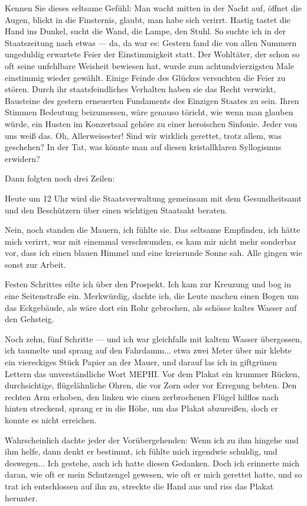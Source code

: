 Kennen Sie dieses seltsame Gefühl: Man wacht mitten in der Nacht
auf, öffnet die Augen, blickt in die Finsternis, glaubt, man habe
sich verirrt. Hastig tastet die Hand ins Dunkel, sucht die Wand,
die Lampe, den Stuhl. So suchte ich in der Staatszeitung nach etwas
— da, da war es: Gestern fand die von allen Nummern ungeduldig
erwartete Feier der Einstimmigkeit statt. Der Wohltäter, der schon
so oft seine unfehlbare Weisheit bewiesen hat, wurde zum
achtundvierzigsten Male einstimmig wieder gewählt. Einige Feinde
des Glückes versuchten die Feier zu stören. Durch ihr
staatsfeindliches Verhalten haben sie das Recht verwirkt, Bausteine
des gestern erneuerten Fundaments des Einzigen Staates zu sein.
Ihren Stimmen Bedeutung beizumessen, wäre genauso töricht, wie wenn
man glauben würde, ein Husten im Konzertsaal gehöre zu einer
heroischen Sinfonie. Jeder von uns weiß das. Oh, Allerweisester!
Sind wir wirklich gerettet, trotz allem, was geschehen? In der Tat,
was könnte man auf diesen kristallklaren Syllogismus erwidern?

Dann folgten noch drei Zeilen:

Heute um 12 Uhr wird die Staatsverwaltung gemeinsam mit dem
Gesundheitsamt und den Beschützern über einen wichtigen Staatsakt
beraten.

Nein, noch standen die Mauern, ich fühlte sie. Das seltsame
Empfinden, ich hätte mich verirrt, war mit einemmal verschwunden,
es kam mir nicht mehr sonderbar vor, dass ich einen blauen Himmel
und eine kreisrunde Sonne sah. Alle gingen wie sonst zur Arbeit.

Festen Schrittes eilte ich über den Prospekt. Ich kam zur Kreuzung
und bog in eine Seitenstraße ein. Merkwürdig, dachte ich, die Leute
machen einen Bogen um das Eckgebäude, als wäre dort ein Rohr
gebrochen, als schösse kaltes Wasser auf den Gehsteig.

Noch zehn, fünf Schritte — und ich war gleichfalls mit kaltem
Wasser übergossen, ich taumelte und sprang auf den Fahrdamm... etwa
zwei Meter über mir klebte ein viereckiges Stück Papier an der
Mauer, und darauf las ich in giftgrünen Lettern das unverständliche
Wort MEPHI. Vor dem Plakat ein krummer Rücken, durchsichtige,
flügelähnliche Ohren, die vor Zorn oder vor Erregung bebten. Den
rechten Arm erhoben, den linken wie einen zerbrochenen Flügel
hilflos nach hinten streckend, sprang er in die Höhe, um das Plakat
abzureißen, doch er konnte es nicht erreichen.

Wahrscheinlich dachte jeder der Vorübergehenden: Wenn ich zu ihm
hingehe und ihm helfe, dann denkt er bestimmt, ich fühlte mich
irgendwie schuldig, und deswegen... Ich gestehe, auch ich hatte
diesen Gedanken. Doch ich erinnerte mich daran, wie oft er mein
Schutzengel gewesen, wie oft er mich gerettet hatte, und so trat
ich entschlossen auf ihn zu, streckte die Hand aus und riss das
Plakat herunter.

